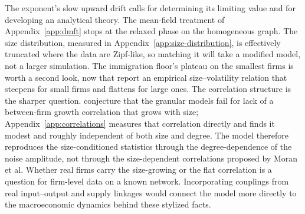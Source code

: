 \enlargethispage{\baselineskip}
The exponent's slow upward drift calls for determining its limiting value and for developing an analytical
theory. The mean-field treatment of Appendix~\ref{app:dmft} stops at the relaxed phase
on the homogeneous graph. The
size distribution, measured in Appendix~\ref{app:size-distribution}, is effectively
truncated where the data are Zipf-like, so matching it will take a modified model, not a
larger simulation.
The immigration floor's plateau on the smallest firms is worth a second look,
now that \citet{fontanelli2025} report an empirical size--volatility relation
that steepens for small firms and flattens for large ones.
The correlation structure is the sharper question. \citet{moran2024} conjecture that
the granular models fail for lack of a between-firm growth correlation that grows
with size; Appendix~\ref{app:correlations} measures that correlation directly and finds it modest
and roughly independent of both size and degree. The model therefore reproduces the
size-conditioned statistics through the degree-dependence of the noise amplitude, not
through the size-dependent correlations proposed by Moran et al. Whether real firms
carry the size-growing or the flat correlation is a question for firm-level data on a
known network. Incorporating couplings from real input--output and supply linkages would connect the model
more directly to the macroeconomic dynamics behind these stylized facts.
